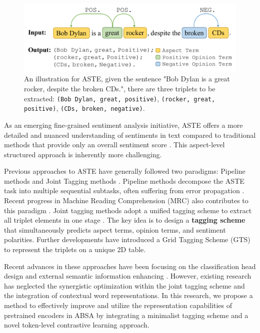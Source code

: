 \documentclass[11pt]{article}
\begin{document}
\begin{figure}[ht]
    \centering
    \includegraphics[width=1\linewidth]{fig_task.pdf}
    \caption{An illustration for ASTE, given the sentence "Bob Dylan is a great rocker, despite the broken CDs.", there are three triplets to be extracted: \texttt{(Bob Dylan, great, positive)}, \texttt{(rocker, great, positive)}, \texttt{(CDs, broken, negative)}. }
    \label{fig:fig_task.pdf}
\end{figure}

As an emerging fine-grained sentiment analysis initiative, ASTE offers a more detailed and nuanced understanding of sentiments in text compared to traditional methods that provide only an overall sentiment score \cite{peng2020knowing}. This aspect-level structured approach is inherently more challenging.


Previous approaches to ASTE have generally followed two paradigms: Pipeline methods and Joint Tagging methods \cite{zhang2022survey}. 
Pipeline methods decompose the ASTE task into multiple sequential subtasks, often suffering from error propagation \cite{xu2020position}. Recent progress in Machine Reading Comprehension (MRC) also contributes to this paradigm \cite{zhai2022mrc, mao2021joint, zou2024multi, chen2021semantic}. 
Joint tagging methods adopt a unified tagging scheme to extract all triplet elements in one stage \cite{xu2020position}. The key idea is to design a \textbf{tagging scheme} \cite{zheng2017joint} that simultaneously predicts aspect terms, opinion terms, and sentiment polarities. Further developments have introduced a Grid Tagging Scheme (GTS) to represent the triplets on a unique 2D table\cite{wu2020grid,zhang2022boundary,chen2021semantic,chen2022enhanced,fei2022inheriting}. 


Recent advances in these approaches have been focusing on the classification head design \cite{chen2022enhanced, zhang2022boundary} and external semantic information enhancing \cite{chen2021semantic, chen2022enhanced, fei2022inheriting, jiang2023semantically, iswari2024enhancing}. However, existing research has neglected the synergistic optimization within the joint tagging scheme and the integration of contextual word representations. In this research, we propose a method to effectively improve and utilize the representation capabilities of pretrained encoders in ABSA by integrating a minimalist tagging scheme and a novel token-level contrastive learning approach. 
\end{document}
